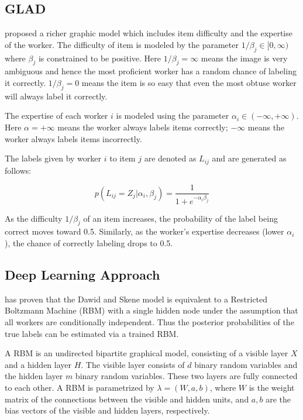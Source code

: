 \documentclass{article}
\begin{document}
\subsection{GLAD}
\cite{NIPS2009_3644} proposed a richer graphic model which includes
item difficulty and the expertise of the worker. The difficulty of
item is modeled by the parameter $1/\beta_j \in [0,\infty)$ where
$\beta_j$ is constrained to be positive. Here $1/\beta_j = \infty$
means the image is very ambiguous and hence the most proficient worker
has a random chance of labeling it correctly. $1/\beta_j = 0$ means the item is
so easy that even the most obtuse worker will always label it correctly.

The expertise of each worker $i$ is modeled using the parameter
$\alpha_i \in (-\infty, +\infty)$. Here $\alpha = +\infty$ means the
worker always labels items correctly; $-\infty$ means the worker
always labels items incorrectly.

The labels given by worker $i$ to item $j$ are denoted as $L_{ij}$
and are generated as follows:

\begin{equation} \label{eq:glad_label}
  p(L_{ij}=Z_j|\alpha_i , \beta_j) = \frac{1}{1+e^{-\alpha_i \beta_j}}
\end{equation}

As the difficulty $1/\beta_j$ of an item increases, the probability of
the label being correct moves toward 0.5. Similarly, as the worker's
expertise decreases (lower $\alpha_i$), the chance of correctly
labeling drops to 0.5.
\subsection{Deep Learning Approach}
\cite{Shaham2016-nh} has proven that the Dawid and Skene model is
equivalent to a Restricted Boltzmann Machine (RBM) with a single
hidden node under the assumption that all workers are conditionally
independent. Thus the posterior probabilities of the true labels can
be estimated via a trained RBM.

A RBM is an undirected bipartite graphical model, consisting of a
visible layer $X$ and a hidden layer $H$. The visible layer consists
of $d$ binary random variables and the hidden layer $m$ binary random
variables. These two layers are fully connected to each other. A RBM
is parametrized by $\lambda = (W, a, b)$, where $W$ is the weight
matrix of the connections between the visible and hidden units, and
$a,b$ are the bias vectors of the visible and hidden layers,
respectively.
\end{document}
